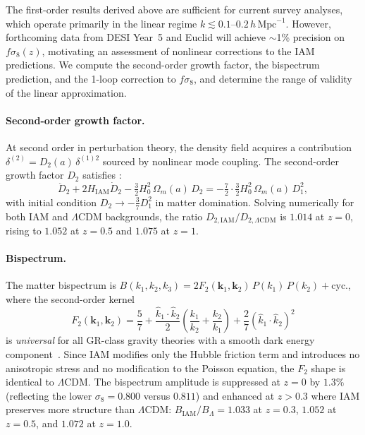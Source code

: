 \documentclass[11pt]{article}
\begin{document}
The first-order results derived above are sufficient for current survey
analyses, which operate primarily in the linear regime
$k \lesssim 0.1$--$0.2\,h\,\mathrm{Mpc}^{-1}$.  However, forthcoming
data from DESI Year~5 and Euclid will achieve $\sim$1\% precision on
$f\sigma_8(z)$, motivating an assessment of nonlinear corrections to the
IAM predictions.  We compute the second-order growth factor, the
bispectrum prediction, and the 1-loop correction to $f\sigma_8$, and
determine the range of validity of the linear approximation.

\paragraph{Second-order growth factor.}
At second order in perturbation theory, the density field acquires a
contribution $\delta^{(2)} = D_2(a)\,\delta^{(1)2}$ sourced by nonlinear
mode coupling.  The second-order growth factor $D_2$ satisfies
\citep{Bernardeau2002}:
\begin{equation}
\ddot{D}_2 + 2H_\mathrm{IAM}\dot{D}_2
  - \tfrac{3}{2}H_0^2\,\Omega_m(a)\,D_2
  = -\tfrac{7}{2}\cdot\tfrac{3}{2}H_0^2\,\Omega_m(a)\,D_1^2,
\label{eq:D2_ode}
\end{equation}
with initial condition $D_2 \to -\frac{3}{7}D_1^2$ in matter domination.
Solving numerically for both IAM and $\Lambda$CDM backgrounds, the ratio
$D_{2,\mathrm{IAM}}/D_{2,\Lambda\mathrm{CDM}}$ is $1.014$ at $z = 0$,
rising to $1.052$ at $z = 0.5$ and $1.075$ at $z = 1$.

\paragraph{Bispectrum.}
The matter bispectrum is
$B(k_1,k_2,k_3) = 2F_2(\mathbf{k}_1,\mathbf{k}_2)\,P(k_1)\,P(k_2)
+ \mathrm{cyc.}$,
where the second-order kernel
\begin{equation}
F_2(\mathbf{k}_1,\mathbf{k}_2)
  = \frac{5}{7}
  + \frac{\hat{k}_1\cdot\hat{k}_2}{2}
    \!\left(\frac{k_1}{k_2}+\frac{k_2}{k_1}\right)
  + \frac{2}{7}(\hat{k}_1\cdot\hat{k}_2)^2
\label{eq:F2_kernel}
\end{equation}
is \textit{universal} for all GR-class gravity theories with a smooth
dark energy component~\citep{Bernardeau2002}.  Since IAM modifies only
the Hubble friction term and introduces no anisotropic stress and no
modification to the Poisson equation, the $F_2$ shape is identical to
$\Lambda$CDM.  The bispectrum amplitude is suppressed at $z = 0$ by
$1.3\%$ (reflecting the lower $\sigma_8 = 0.800$ versus $0.811$) and
enhanced at $z > 0.3$ where IAM preserves more structure than
$\Lambda$CDM: $B_\mathrm{IAM}/B_\Lambda = 1.033$ at $z = 0.3$, $1.052$
at $z = 0.5$, and $1.072$ at $z = 1.0$.
\end{document}
